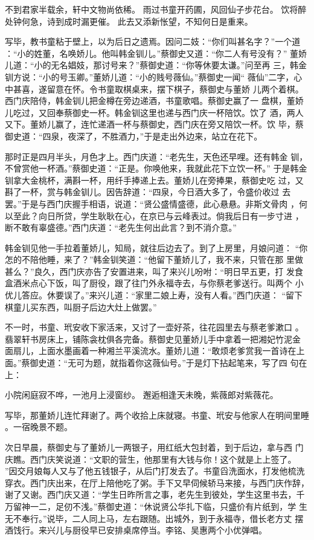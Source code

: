 不到君家半载余，轩中文物尚依稀。
雨过书童开药圃，风回仙子步花台。
饮将醉处钟何急，诗到成时漏更催。
此去又添新怅望，不知何日是重来。

写毕，教书童粘于壁上，以为后日之遗焉。因问二妓：“你们叫甚名字？”一个道
：“小的姓董，名唤娇儿。他叫韩金钏儿。”蔡御史又道：“你二人有号没有？”
董娇儿道：“小的无名娼妓，那讨号来？”蔡御史道：“你等休要太谦。”问至再
三，韩金钏方说：“小的号玉卿。”董娇儿道：“小的贱号薇仙。”蔡御史一闻“
薇仙”二字，心中甚喜，遂留意在怀。令书童取棋桌来，摆下棋子，蔡御史与董娇
儿两个着棋。西门庆陪侍，韩金钏儿把金樽在旁边递酒，书童歌唱。蔡御史赢了一
盘棋，董娇儿吃过，又回奉蔡御史一杯。韩金钏这里也递与西门庆一杯陪饮。饮了
酒，两人又下。董娇儿赢了，连忙递酒一杯与蔡御史，西门庆在旁又陪饮一杯。饮
毕，蔡御史道：“四泉，夜深了，不胜酒力，”于是走出外边来，站立在花下。

那时正是四月半头，月色才上。西门庆道：“老先生，天色还早哩。还有韩金
钏，不曾赏他一杯酒。”蔡御史道：“正是。你唤他来，我就此花下立饮一杯。”
于是韩金钏拿大金桃杯，满斟一杯，用纤手捧递上去。董娇儿在旁捧果，蔡御史吃
过，又斟了一杯，赏与韩金钏儿。因告辞道：“四泉，今日酒大多了，令盛价收过
去罢。”于是与西门庆握手相语，说道：“贤公盛情盛德，此心悬悬。非斯文骨肉
，何以至此？向日所贷，学生耿耿在心，在京已与云峰表过。倘我后日有一步寸进
，断不敢有辜盛德。”西门庆道：“老先生何出此言？到不消介意。”

韩金钏见他一手拉着董娇儿，知局，就往后边去了。到了上房里，月娘问道：
“你怎的不陪他睡，来了？”韩金钏笑道：“他留下董娇儿了，我不来，只管在那
里做甚么？”良久，西门庆亦告了安置进来，叫了来兴儿吩咐：“明日早五更，打
发食盒酒米点心下饭，叫了厨役，跟了往门外永福寺去，与你蔡老爹送行。叫两个
小优儿答应。休要误了。”来兴儿道：“家里二娘上寿，没有人看。”西门庆道：
“留下棋童儿买东西，叫厨子后边大灶上做罢。”

不一时，书童、玳安收下家活来，又讨了一壶好茶，往花园里去与蔡老爹漱口
。翡翠轩书房床上，铺陈衾枕俱各完备。蔡御史见董娇儿手中拿着一把湘妃竹泥金
面扇儿，上面水墨画着一种湘兰平溪流水。董娇儿道：“敢烦老爹赏我一首诗在上
面。”蔡御史道：“无可为题，就指着你这薇仙号。”于是灯下拈起笔来，写了四
句在上：

小院闲庭寂不哗，一池月上浸窗纱。
邂逅相逢天未晚，紫薇郎对紫薇花。

写毕，那董娇儿连忙拜谢了。两个收拾上床就寝。书童、玳安与他家人在明间里睡
。一宿晚景不题。

次日早晨，蔡御史与了董娇儿一两银子，用红纸大包封着，到于后边，拿与西
门庆瞧。西门庆笑说道：“文职的营生，他那里有大钱与你！这个就是上上签了。
”因交月娘每人又与了他五钱银子，从后门打发去了。书童舀洗面水，打发他梳洗
穿衣。西门庆出来，在厅上陪他吃了粥。手下又早伺候轿马来接，与西门庆作辞，
谢了又谢。西门庆又道：“学生日昨所言之事，老先生到彼处，学生这里书去，千
万留神一二，足仞不浅。”蔡御史道：“休说贤公华扎下临，只盛价有片纸到，学
生无不奉行。”说毕，二人同上马，左右跟随。出城外，到于永福寺，借长老方丈
摆酒饯行。来兴儿与厨役早已安排桌席停当。李铭、吴惠两个小优弹唱。

